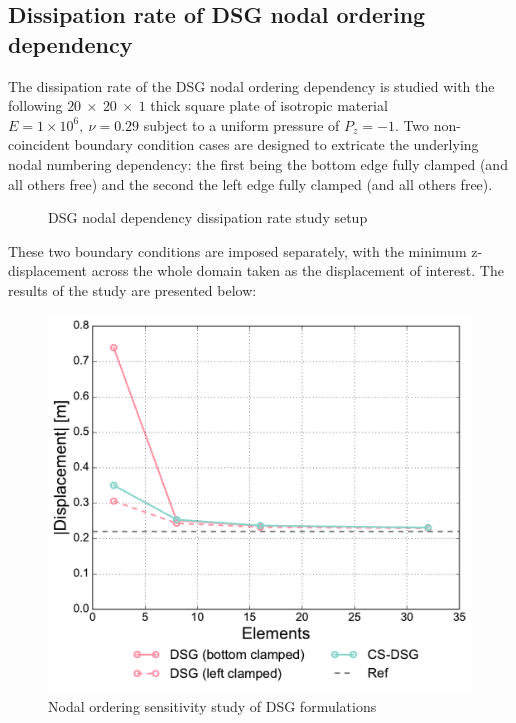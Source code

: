 \subsection{Dissipation rate of DSG nodal ordering dependency}
The dissipation rate of the DSG nodal ordering dependency is studied with the following $20\ \times\ 20\ \times\ 1$ thick square plate of isotropic material $E = 1\times10^6,\ \nu = 0.29$ subject to a uniform pressure of $P_z = -1$. Two non-coincident boundary condition cases are designed to extricate the underlying nodal numbering dependency: the first being the bottom edge fully clamped (and all others free) and the second the left edge fully clamped (and all others free). 

\begin{figure}[H]
	\caption{\label{csdsg_nodal_dissipation}DSG nodal dependency dissipation rate study setup}
\end{figure}

These two boundary conditions are imposed separately, with the minimum z-displacement across the whole domain taken as the displacement of interest. The results of the study are presented below:

\begin{figure}[H]
	\centering
	\includegraphics[width=12cm]{images/node_ordering_study.pdf}
	\caption{Nodal ordering sensitivity study of DSG formulations}
	\label{fig:Nodal ordering sensitivity study}
\end{figure}


